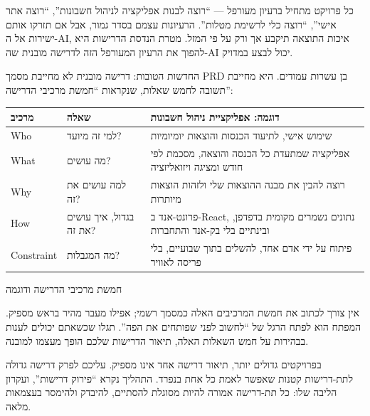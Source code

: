 


כל פרויקט מתחיל ברעיון מעורפל — “רוצה לבנות אפליקציה לניהול חשבונות”, “רוצה אתר אישי”, “רוצה כלי לרשימת מטלות”. הרעיונות עצמם בסדר גמור, אבל אם תזרקו אותם ישירות אל ה-AI, איכות התוצאה תיקבע אך ורק על פי המזל. מטרת הנדסת הדרישות היא להפוך את הרעיון המעורפל הזה לדרישה מובנית שה-AI יכול לבצע במדויק.

החדשות הטובות: דרישה מובנית לא מחייבת מסמך PRD בן עשרות עמודים. היא מחייבת תשובה לחמש שאלות, שנקראות “חמשת מרכיבי הדרישה”:

\begin{center}
\begin{tabularx}{\linewidth}{|X|X|X|}
\hline
\textbf{מרכיב} & \textbf{שאלה} & \textbf{דוגמה: אפליקציית ניהול חשבונות} \tabularnewline
\hline
Who & למי זה מיועד? & שימוש אישי, לתיעוד הכנסות והוצאות יומיומיות \tabularnewline
What & מה עושים? & אפליקציה שמתעדת כל הכנסה והוצאה, מסכמת לפי חודש ומציגה ויזואליזציה \tabularnewline
Why & למה עושים את זה? & רוצה להבין את מבנה ההוצאות שלי ולזהות הוצאות מיותרות \tabularnewline
How & בגדול, איך עושים את זה? & פרונט-אנד ב-React, נתונים נשמרים מקומית בדפדפן, ובינתיים בלי בק-אנד והתחברות \tabularnewline
Constraint & מה המגבלות? & פיתוח על ידי אדם אחד, להשלים בתוך שבועיים, בלי פריסה לאוויר \tabularnewline
\hline
\end{tabularx}
\end{center}

\begin{center}\small\color{gray}חמשת מרכיבי הדרישה ודוגמה\end{center}

אין צורך לכתוב את חמשת המרכיבים האלה כמסמך רשמי; אפילו מעבר מהיר בראש מספיק. המפתח הוא לפתח הרגל של “לחשוב לפני שפותחים את הפה”. תגלו שכשאתם יכולים לענות בבהירות על חמש השאלות האלה, תיאור הדרישות שלכם הופך מעצמו למובנה.


בפרויקטים גדולים יותר, תיאור דרישה אחד אינו מספיק. עליכם לפרק דרישה גדולה לתת-דרישות קטנות שאפשר לאמת כל אחת בנפרד. התהליך נקרא “פירוק דרישות”, ועקרון הליבה שלו: כל תת-דרישה אמורה להיות מסוגלת להסתיים, להיבדק ולהימסר בעצמאות מלאה.

